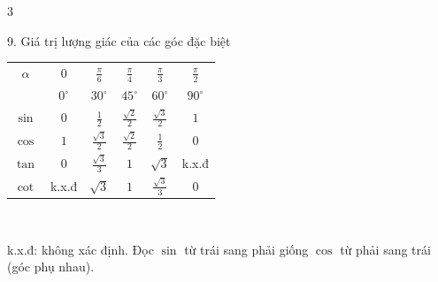 \documentclass[10pt]{extarticle}
\newcommand{\ghi}[1]{{\color{muted}\small #1}}
\begin{document}
\begin{multicols*}{3}
\begin{muc}[key]{9. Giá trị lượng giác của các góc đặc biệt}
\centering\small
\renewcommand{\arraystretch}{1.45}
\setlength{\tabcolsep}{3.2pt}
\begin{tabular}{@{}c|ccccc@{}}
$\alpha$ & $0$ & $\frac{\pi}{6}$ & $\frac{\pi}{4}$ & $\frac{\pi}{3}$ & $\frac{\pi}{2}$\\
 & \scriptsize$0^\circ$ & \scriptsize$30^\circ$ & \scriptsize$45^\circ$ & \scriptsize$60^\circ$ & \scriptsize$90^\circ$\\\hline
\color{sinc}$\sin$ & $0$ & $\frac12$ & $\frac{\sqrt2}{2}$ & $\frac{\sqrt3}{2}$ & $1$\\
\color{cosc}$\cos$ & $1$ & $\frac{\sqrt3}{2}$ & $\frac{\sqrt2}{2}$ & $\frac12$ & $0$\\
\color{tanc}$\tan$ & $0$ & $\frac{\sqrt3}{3}$ & $1$ & $\sqrt3$ & \color{muted}\scriptsize k.x.đ\\
\color{cotc}$\cot$ & \color{muted}\scriptsize k.x.đ & $\sqrt3$ & $1$ & $\frac{\sqrt3}{3}$ & $0$
\end{tabular}\\[2pt]
\raggedright\ghi{k.x.đ: không xác định. Đọc $\sin$ từ trái sang phải giống $\cos$ từ phải sang trái (góc phụ nhau).}
\end{muc}

\end{multicols*}
\end{document}
